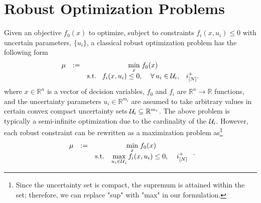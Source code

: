 \documentclass[journal,twoside,web]{ieeecolor}
\newcommand{\real}{\mathbb{R}}
\begin{document}
\section{Robust Optimization Problems}\label{sec_RO}
Given an objective $f_0(x)$ to optimize, subject to constraints $f_i(x,u_i) \leq 0$ with uncertain parameters, $\{u_i\}$, a classical robust optimization problem has the following form
$$
\begin{array}{ccc}
\mu&:=&\underset{x}{\min}\; f_0(x)\\
&&\text{s.t.}\;\;\;f_i(x,u_i)\leq 0,\;\;\;\; \forall \,u_i\in {\cal U}_i,\;\;\;i^+_{[N]}.
\end{array}
$$
where $x\in \real^n$ is a vector of decision variables, $f_0$ and $f_i$ are $\real^n \to \real$ functions, and the uncertainty parameters $u_i \in \real^{m_i}$ are assumed to take arbitrary values in certain convex compact uncertainty sets ${\cal U}_i \subseteq \real^{m_i}$. 
The above problem is typically a semi-infinite optimization due to the cardinality of the ${\cal U}_i$. However, each robust constraint can be rewritten as a maximization problem as\footnote{Since the uncertainty set is compact, 
the supremum is attained within the set; therefore, we can replace "sup" with "max" in our formulation.}
\begin{align}
\begin{array}{ccc}
\mu&:=&\underset{x}{\min}\; f_0(x)\\
&&\text{s.t.}\;\;\;\displaystyle\max_{{u_i\in \cal U}_i} f_i(x,u_i)\leq 0,\;\;\;\;i^+_{[N]}
\end{array}\;.\label{standardRO}
\end{align}
\end{document}
